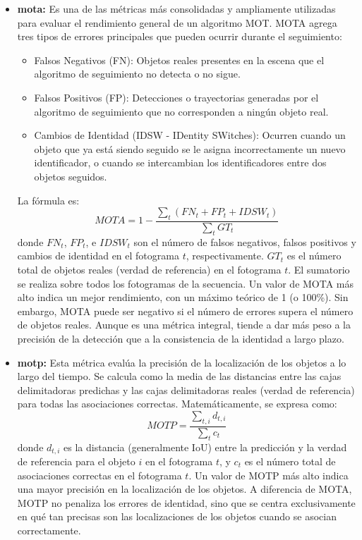 \documentclass[11pt,spanish,listoffigures,listoftables]{tfgetsinf}
\begin{document}
\begin{itemize}
   \item \textbf{\gls{mota}:} Es una de las métricas más consolidadas y ampliamente utilizadas para evaluar el rendimiento general de un algoritmo MOT. MOTA agrega tres tipos de errores principales que pueden ocurrir durante el seguimiento:
   \begin{itemize}
     \item Falsos Negativos (FN): Objetos reales presentes en la escena que el algoritmo de seguimiento no detecta o no sigue.
     \item Falsos Positivos (FP): Detecciones o trayectorias generadas por el algoritmo de seguimiento que no corresponden a ningún objeto real.
     \item Cambios de Identidad (IDSW - IDentity SWitches): Ocurren cuando un objeto que ya está siendo seguido se le asigna incorrectamente un nuevo identificador, o cuando se intercambian los identificadores entre dos objetos seguidos.
   \end{itemize}
   La fórmula es:
   \begin{equation}
   MOTA = 1 - \frac{\sum_{t} (FN_t + FP_t + IDSW_t)}{\sum_{t} GT_t}
   \end{equation}
   donde \(FN_t\), \(FP_t\), e \(IDSW_t\) son el número de falsos negativos, falsos positivos y cambios de identidad en el fotograma \(t\), respectivamente. \(GT_t\) es el número total de objetos reales (verdad de referencia) en el fotograma \(t\). El sumatorio se realiza sobre todos los fotogramas de la secuencia.
   Un valor de MOTA más alto indica un mejor rendimiento, con un máximo teórico de 1 (o 100\%). Sin embargo, MOTA puede ser negativo si el número de errores supera el número de objetos reales. Aunque es una métrica integral, tiende a dar más peso a la precisión de la detección que a la consistencia de la identidad a largo plazo.

   \item \textbf{\gls{motp}:} Esta métrica evalúa la precisión de la localización de los objetos a lo largo del tiempo. Se calcula como la media de las distancias entre las cajas delimitadoras predichas y las cajas delimitadoras reales (verdad de referencia) para todas las asociaciones correctas. Matemáticamente, se expresa como:
   \begin{equation}
   MOTP = \frac{\sum_{t,i} d_{t,i}}{\sum_{t} c_t}
   \end{equation}
   donde $d_{t,i}$ es la distancia (generalmente IoU) entre la predicción y la verdad de referencia para el objeto $i$ en el fotograma $t$, y $c_t$ es el número total de asociaciones correctas en el fotograma $t$. Un valor de MOTP más alto indica una mayor precisión en la localización de los objetos. A diferencia de MOTA, MOTP no penaliza los errores de identidad, sino que se centra exclusivamente en qué tan precisas son las localizaciones de los objetos cuando se asocian correctamente.


\end{itemize}
\end{document}
